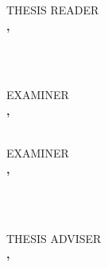 \documentclass[a4paper, 12pt]{report}
\begin{document}
                \begin{minipage}[t]{.44\textwidth}\centering
                     THESIS READER\\
                    \vspace{0.1 cm} 
                    \textbf{\MakeUppercase{\reader}, \readerdegree}\\
                    \small{
                    \readerposition\\
                    \readeruniv}
                \end{minipage}\\
    
                \vspace{0.75 cm} 
                \begin{minipage}[t]{.44\textwidth}\centering
                    EXAMINER\\
                    \vspace{0.1 cm} 
                    \textbf{\MakeUppercase{\examiner}, \examinerdegree}\\
                    \small{
                    \examinerposition\\
                    \examineruniv}
                \end{minipage}\hspace{.02\textwidth}
                \begin{minipage}[t]{.44\textwidth}\centering
                    EXAMINER\\
                    \vspace{0.1 cm} 
                    \textbf{\MakeUppercase{\examiner}, \examinerdegree}\\
                    \small{
                    \examinerposition\\
                    \examineruniv}
                \end{minipage}\\
                \vspace{0.75 cm}
            \else
                \begin{minipage}[t]{.44\textwidth}\centering
                    THESIS ADVISER\\
                    \vspace{0.1 cm} 
                    \textbf{\MakeUppercase{\adviserone}, \adviseronedegree}\\
                    \small{
                    \adviseroneposition\\
                    \adviseroneuniv}
                \end{minipage}\hspace{.02\textwidth}
\end{document}
